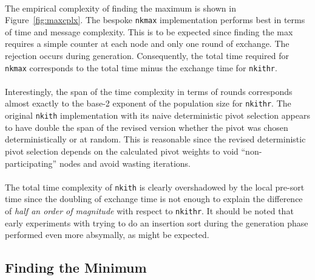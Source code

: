 \documentclass[11pt,epsf]{article}
\begin{document}
{{    \paragraph{}{
      The empirical complexity of finding the maximum is shown in Figure~\ref{fig:maxcplx}.
      The bespoke \texttt{nkmax} implementation performs best in terms of time and
      message complexity. This is to be expected since finding the max requires a
      simple counter at each node and only one round of exchange. The rejection
      occurs during generation. Consequently, the total time required for \texttt{nkmax}
      corresponds to the total time minus the exchange time for \texttt{nkithr}.
    }
    \paragraph{}{
      Interestingly, the span of the time complexity in terms of rounds corresponds
      almost exactly to the base-2 exponent of the population size for \texttt{nkithr}.
      The original \texttt{nkith} implementation with its naive deterministic pivot
      selection appears to have double the span of the revised version whether the pivot
      was chosen deterministically or at random. This is reasonable since the revised
      deterministic pivot selection depends on the calculated pivot weights to void
      ``non-participating'' nodes and avoid wasting iterations.
    }
    \paragraph{}{
      The total time complexity of \texttt{nkith} is clearly overshadowed by the
      local pre-sort time since the doubling of exchange time is not enough to
      explain the difference of \emph{half an order of magnitude} with respect to
      \texttt{nkithr}. It should be noted that early experiments with trying to do
      an insertion sort during the generation phase performed even more absymally,
      as might be expected.
    }
  }
  \subsection{Finding the Minimum}{
}}
\end{document}
